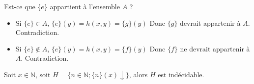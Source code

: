 Est-ce que $\{ e \}$ appartient à l'ensemble $A$ ?

\begin{itemize}
	\item Si $\{e\} \in A$, $\{e\}(y)=h(x,y)=\{g\}(y)$ 
	Donc $\{g\}$ devrait appartenir à $A$. Contradiction.

	\item Si $\{e\} \notin A$, $\{e\}(y)=h(x,y)=\{f\}(y)$ 
	Donc $\{ f\}$ ne devrait appartenir à $A$. Contradiction.
\end{itemize}

\begin{theoreme} 
Soit $x \in \mathbb{N}$, soit $H=\{ n\in \mathbb{N}; \{n\}(x) \downarrow \}$, alors $H$ est indécidable.
\end{theoreme}
